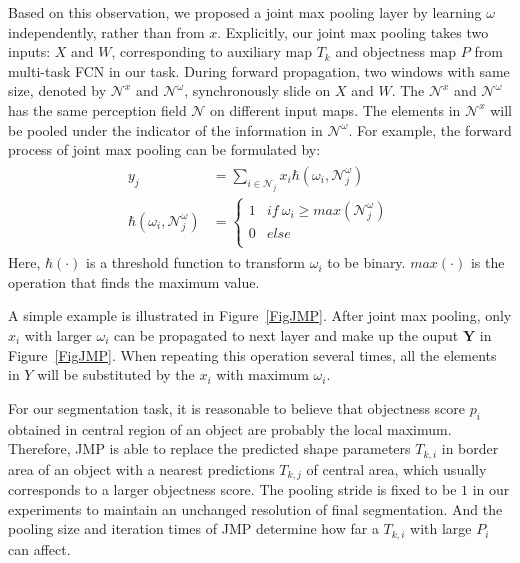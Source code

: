 Based on this observation, we proposed a joint max pooling layer  by learning $\omega$ independently, rather than from $x$.
Explicitly, our joint max pooling takes two inputs: $X$ and $W$, corresponding to auxiliary map $T_k$ and objectness map $P$ from multi-task FCN in our task.
During forward propagation, two windows with same size, denoted by $\mathcal{N}^{x}$ and $\mathcal{N}^{\omega}$, synchronously slide on $X$ and $W$.
The $\mathcal{N}^{x}$ and $\mathcal{N}^{\omega}$ has the same perception field $\mathcal{N}$ on different input maps.
The elements in $\mathcal{N}^{x}$ will be pooled under the indicator of the information in $\mathcal{N}^{\omega}$.
For example, the forward process of joint max pooling can be formulated by:
\begin{eqnarray}\label{jmp}
\begin{aligned}
y_{j} &= \sum_{i\in \mathcal{N}_{j}}x_{i}\hbar(\omega_{i},\mathcal{N}^{\omega}_{j})\\
\hbar(\omega_{i},\mathcal{N}^{\omega}_{j})&=\left\{\begin{array}{cc}
1&if~\omega_{i}\geq max(\mathcal{N}^{\omega}_{j})\\
0&else\\
\end{array}\right.
\end{aligned}
\end{eqnarray}
Here, $\hbar(\cdot)$ is a threshold function to transform $\omega_i$ to be binary.
$max(\cdot)$ is the operation that finds the maximum value.

A simple example is illustrated in Figure~\ref{FigJMP}.
After joint max pooling, only $x_i$ with larger $\omega_i$ can be propagated to next layer and make up the ouput $\mathbf{Y}$ in Figure~\ref{FigJMP}.
When repeating this operation several times, all the elements in $Y$ will be substituted by the $x_i$ with maximum $\omega_i$.

For our segmentation task, it is reasonable to believe that objectness score $p_i$ obtained in central region of an object are probably the local maximum.
Therefore, JMP is able to replace the predicted shape parameters $T_{k,i}$ in border area of an object with a nearest predictions $T_{k,j}$ of central area, which usually corresponds to a larger objectness score.
The pooling stride is fixed to be $1$ in our experiments to maintain an unchanged resolution of final segmentation.
And the pooling size and iteration times of JMP determine how far a $T_{k,i}$ with large $P_i$ can affect.

